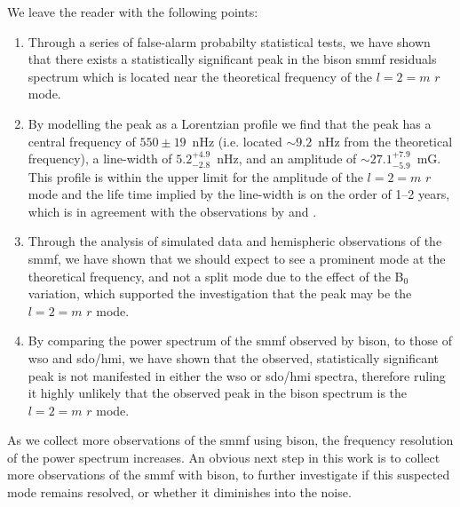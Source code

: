 We leave the reader with the following points:

\begin{enumerate}
	\item{Through a series of false-alarm probabilty statistical tests, we have shown that there exists a statistically significant peak in the \gls{bison} \gls{smmf} residuals spectrum which is located near the theoretical frequency of the $l=2=m$ $r$ mode.}
	
	\item{By modelling the peak as a Lorentzian profile we find that the peak has a central frequency of $550 \pm 19$~nHz (i.e. located $\sim 9.2$~nHz from the theoretical frequency), a line-width of $5.2^{+4.9}_{-2.8}$~nHz, and an amplitude of $\sim 27.1^{+7.9}_{-5.9}$~mG. This profile is within the upper limit for the amplitude of the $l=2=m$ $r$ mode and the life time implied by the line-width is on the order of 1--2 years, which is in agreement with the observations by \citet{loptien_global-scale_2018} and \citet{liang_time-distance_2019}.}
	
	\item{Through the analysis of simulated data and hemispheric observations of the \gls{smmf}, we have shown that we should expect to see a prominent mode at the theoretical frequency, and not a split mode due to the effect of the B$_0$ variation, which supported the investigation that the peak may be the $l=2=m$ $r$ mode.}
	
	\item{By comparing the power spectrum of the \gls{smmf} observed by \gls{bison}, to those of \gls{wso} and \gls{sdo/hmi}, we have shown that the observed, statistically significant peak is not manifested in either the \gls{wso} or \gls{sdo/hmi} spectra, therefore ruling it highly unlikely that the observed peak in the \gls{bison} spectrum is the $l=2=m$ $r$ mode.}
\end{enumerate}


As we collect more observations of the \gls{smmf} using \gls{bison}, the frequency resolution of the power spectrum increases. An obvious next step in this work is to collect more observations of the \gls{smmf} with \gls{bison}, to further investigate if this suspected mode remains resolved, or whether it diminishes into the noise.